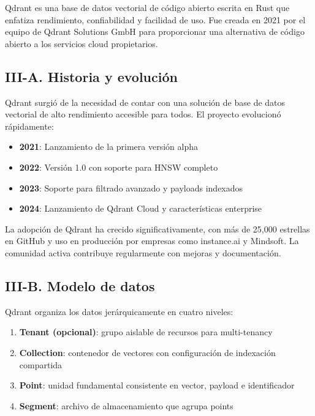 \documentclass[conference]{IEEEtran}
\begin{document}
Qdrant es una base de datos vectorial de código abierto escrita en Rust que enfatiza rendimiento, confiabilidad y facilidad de uso. Fue creada en 2021 por el equipo de Qdrant Solutions GmbH para proporcionar una alternativa de código abierto a los servicios cloud propietarios.

\subsection{III-A. Historia y evolución}

Qdrant surgió de la necesidad de contar con una solución de base de datos vectorial de alto rendimiento accesible para todos. El proyecto evolucionó rápidamente:

\begin{itemize}
    \item \textbf{2021}: Lanzamiento de la primera versión alpha
    \item \textbf{2022}: Versión 1.0 con soporte para HNSW completo
    \item \textbf{2023}: Soporte para filtrado avanzado y payloads indexados
    \item \textbf{2024}: Lanzamiento de Qdrant Cloud y características enterprise
\end{itemize}

La adopción de Qdrant ha crecido significativamente, con más de 25,000 estrellas en GitHub y uso en producción por empresas como instance.ai y Mindsoft. La comunidad activa contribuye regularmente con mejoras y documentación.

\subsection{III-B. Modelo de datos}

Qdrant organiza los datos jerárquicamente en cuatro niveles:

\begin{enumerate}
    \item \textbf{Tenant (opcional)}: grupo aislable de recursos para multi-tenancy
    \item \textbf{Collection}: contenedor de vectores con configuración de indexación compartida
    \item \textbf{Point}: unidad fundamental consistente en vector, payload e identificador
    \item \textbf{Segment}: archivo de almacenamiento que agrupa points
\end{enumerate}
\end{document}
